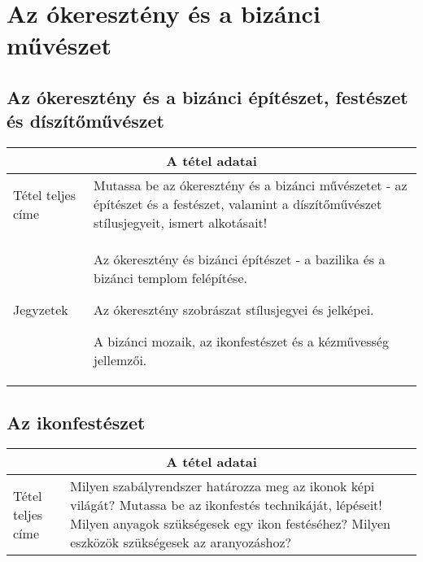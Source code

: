 \chapter{Az ókeresztény és a bizánci művészet} %
\label{ch:4_okereszteny_bizanc}

\section{Az ókeresztény és a bizánci építészet, festészet és díszítőművészet}

\begin{center}
	\begin{longtable}{ | p{} | p{} | }
		
		\hline
		\multicolumn{2}{|c|}{\textbf{A tétel adatai}}
		\\ \hline
		
		\hline
		Tétel teljes címe
		&
		Mutassa be az ókeresztény és a bizánci művészetet - az építészet és a festészet, valamint a díszítőművészet stílusjegyeit, ismert alkotásait!
		\\ \hline
		
		Jegyzetek
		&
		\begin{compactitem}
			\item Az ókeresztény és bizánci építészet - a bazilika és a bizánci templom felépítése.
			\item Az ókeresztény szobrászat stílusjegyei és jelképei.
			\item A bizánci mozaik, az ikonfestészet és a kézművesség jellemzői.
		\end{compactitem}
		\\\hline
		
	\end{longtable}
\end{center}

\cleardoublepage


\section{Az ikonfestészet}

\begin{center}
	\begin{longtable}{ | p{} | p{} | }
		
		\hline
		\multicolumn{2}{|c|}{\textbf{A tétel adatai}}
		\\ \hline
		
		\hline
		Tétel teljes címe 
		&
		Milyen szabályrendszer határozza meg az ikonok képi világát? Mutassa be az ikonfestés technikáját, lépéseit! Milyen anyagok szükségesek egy ikon festéséhez? Milyen eszközök szükségesek az aranyozáshoz?
		\\ \hline
		
	\end{longtable}
\end{center}
